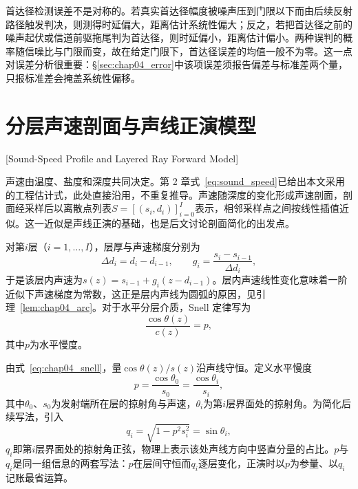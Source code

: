 首达径检测误差不是对称的。若真实首达径幅度被噪声压到门限以下而由后续反射路径触发判决，则测得时延偏大，距离估计系统性偏大；反之，若把首达径之前的噪声起伏或信道前驱拖尾判为首达径，则时延偏小，距离估计偏小。两种误判的概率随信噪比与门限而变，故在给定门限下，首达径误差的均值一般不为零。这一点对误差分析很重要：\S\ref{sec:chap04_error}中该项误差须报告偏差与标准差两个量，只报标准差会掩盖系统性偏移。

\section{分层声速剖面与声线正演模型}[Sound-Speed Profile and Layered Ray Forward Model]
\label{sec:chap04_forward}

声速由温度、盐度和深度共同决定。第 2 章式~\eqref{eq:sound_speed}已给出本文采用的工程估计式，此处直接沿用，不重复推导。声速随深度的变化形成声速剖面，剖面经采样后以离散点列表$S=[(s_i,d_i)]_{i=0}^{I}$表示，相邻采样点之间按线性插值近似。这一近似是声线正演的基础，也是后文讨论剖面简化的出发点。

对第$i$层（$i=1,\dots,I$），层厚与声速梯度分别为
\begin{equation}
 \Delta d_i=d_i-d_{i-1},\qquad
 g_i=\frac{s_i-s_{i-1}}{\Delta d_i},
\label{eq:chap04_gradient}
\end{equation}
于是该层内声速为$s(z)=s_{i-1}+g_i(z-d_{i-1})$。层内声速线性变化意味着一阶近似下声速梯度为常数，这正是层内声线为圆弧的原因，见引理~\ref{lem:chap04_arc}。对于水平分层介质，Snell 定律写为
\begin{equation}
 \frac{\cos\theta(z)}{c(z)}=p,
\label{eq:chap04_snell}
\end{equation}
其中$p$为水平慢度。

由式~\eqref{eq:chap04_snell}，量$\cos\theta(z)/s(z)$沿声线守恒。定义水平慢度
\begin{equation}
 p=\frac{\cos\theta_0}{s_0}=\frac{\cos\theta_i}{s_i},
\label{eq:chap04_pq}
\end{equation}
其中$\theta_0$、$s_0$为发射端所在层的掠射角与声速，$\theta_i$为第$i$层界面处的掠射角。为简化后续写法，引入
\begin{equation}
 q_i=\sqrt{1-p^{2}s_i^{2}}=\sin\theta_i ,
\label{eq:chap04_qi}
\end{equation}
$q_i$即第$i$层界面处的掠射角正弦，物理上表示该处声线方向中竖直分量的占比。$p$与$q_i$是同一组信息的两套写法：$p$在层间守恒而$q_i$逐层变化，正演时以$p$为参量、以$q_i$记账最省运算。

